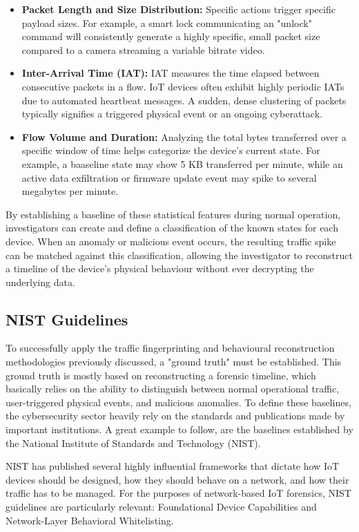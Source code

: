 \begin{itemize}
	\item \textbf{Packet Length and Size Distribution:} Specific actions trigger specific payload sizes. For example, a smart lock communicating an "unlock" command will consistently generate a highly specific, small packet size compared to a camera streaming a variable bitrate video.
	\item \textbf{Inter-Arrival Time (IAT):} IAT measures the time elapsed between consecutive packets in a flow. IoT devices often exhibit highly periodic IATs due to automated heartbeat messages. A sudden, dense clustering of packets typically signifies a triggered physical event or an ongoing cyberattack.
	\item \textbf{Flow Volume and Duration:} Analyzing the total bytes transferred over a specific window of time helps categorize the device's current state. For example, a baaseline state may show 5 KB transferred per minute, while an active data exfiltration or firmware update event may spike to several megabytes per minute.
\end{itemize}

By establishing a baseline of these statistical features during normal operation, investigators can create and define a classification of the known states for each device. When an anomaly or malicious event occurs, the resulting traffic spike can be matched against this classification, allowing the investigator to reconstruct a timeline of the device's physical behaviour without ever decrypting the underlying data.


\subsection{NIST Guidelines}
To successfully apply the traffic fingerprinting and behavioural reconstruction methodologies previously discussed, a "ground truth" must be established. This ground truth is mostly based on reconstructing a forensic timeline, which basically relies on the ability to distinguish between normal operational traffic, user-triggered physical events, and malicious anomalies. To define these baselines, the cybersecurity sector heavily rely on the standards and publications made by important institutions. A great example to follow, are the baselines established by the National Institute of Standards and Technology (NIST).

NIST has published several highly influential frameworks that dictate how IoT devices should be designed, how they should behave on a network, and how their traffic has to be managed. For the purposes of network-based IoT forensics, NIST guidelines are particularly relevant: Foundational Device Capabilities and Network-Layer Behavioral Whitelisting.

